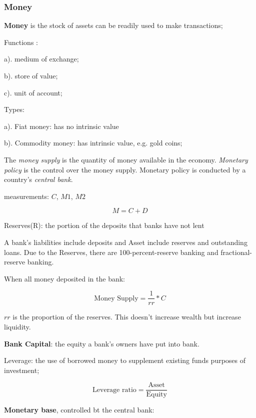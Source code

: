 \documentclass[10pt, a4paper]{article}
\begin{document}
            \subsubsection{Money}
                \textbf{Money} is the stock of assets can be readily used to make transactions; 
                
                Functions : 

                a). medium of exchange; 
                
                b). store of value; 
                
                c). unit of account; 

                Types: 

                a). Fiat money: has no intrinsic value 

                b). Commodity money: has intrinsic value, e.g. gold coins; 

                The \emph{money supply} is the quantity of money available in the economy. \emph{Monetary policy} is the control over the money supply. Monetary policy is conducted by a country's \emph{central bank}. 

                measurements: $C$, $M1$, $M2$

                $$M = C + D$$

                Reserves(R): the portion of the deposits that banks have not lent

                A bank's liabilities include deposits and Asset include reserves and outstanding loans. Due to the Reserves, there are 100-percent-reserve banking and fractional-reserve banking. 
                
                When all money deposited in the bank: 
                
                $$\text{Money Supply} = \frac{1}{rr} * C$$

                $rr$ is the proportion of the reserves. This doesn't increase wealth but increase liquidity.

                \textbf{Bank Capital}: the equity a bank's owners have put into bank. 

                Leverage: the use of borrowed money to supplement existing funds purposes of investment; 

                $$\text{Leverage ratio} = \frac{\text{Asset}}{\text{Equity}}$$

                \textbf{Monetary base}, controlled bt the central bank: 
\end{document}
